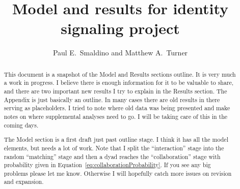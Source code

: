 \documentclass[11pt,letterpaper]{article}
\title{Model and results for identity signaling project}
\author{{Paul E.~Smaldino and Matthew A.~Turner}}
\begin{document}
\maketitle

\begin{abstract}
    This document is a snapshot of the Model and Results sections outline.
    It is very much a work in progress. I believe there is enough information 
    for it to be valuable to share, and there are two important new results
    I try to explain in the Results section. The Appendix is just basically
    an outline. In many cases there are old results in there serving as
    placeholders. I tried to note where old data was being presented and
    make notes on where supplemental analyses need to go. I will be taking
    care of this in the coming days.

    The Model section is a first
    draft just past outline stage. I think it has all the model elements, but 
    needs a lot of work. Note that I split the ``interaction'' stage into
    the random ``matching'' stage and then 
    a dyad reaches the ``collaboration'' stage with probability
    given in Equation~\ref{eq:collaborationProbability}. 
    If you see any big problems please let me know. 
    Otherwise I will hopefully catch more issues on revision and expansion.


\end{abstract}
\end{document}
